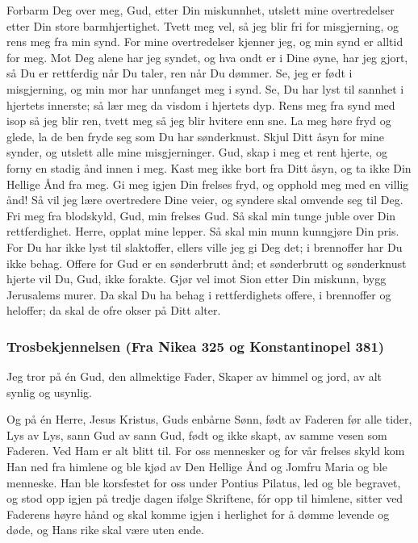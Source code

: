 Forbarm Deg over meg, Gud, etter Din miskunnhet, utslett mine overtredelser etter Din store barmhjertighet. Tvett meg vel, så jeg blir fri for misgjerning, og rens meg fra min synd. For mine overtredelser kjenner jeg, og min synd er alltid for meg. Mot Deg alene har jeg syndet, og hva ondt er i Dine øyne, har jeg gjort, så Du er rettferdig når Du taler, ren når Du dømmer. Se, jeg er født i misgjerning, og min mor har unnfanget meg i synd. Se, Du har lyst til sannhet i hjertets innerste; så lær meg da visdom i hjertets dyp. Rens meg fra synd med isop så jeg blir ren, tvett meg så jeg blir hvitere enn sne. La meg høre fryd og glede, la de ben fryde seg som Du har sønderknust. Skjul Ditt åsyn for mine synder, og utslett alle mine misgjerninger. Gud, skap i meg et rent hjerte, og forny en stadig ånd innen i meg. Kast meg ikke bort fra Ditt åsyn, og ta ikke Din Hellige Ånd fra meg. Gi meg igjen Din frelses fryd, og opphold meg med en villig ånd! Så vil jeg lære overtredere Dine veier, og syndere skal omvende seg til Deg. Fri meg fra blodskyld, Gud, min frelses Gud. Så skal min tunge juble over Din rettferdighet. Herre, opplat mine lepper. Så skal min munn kunngjøre Din pris. For Du har ikke lyst til slaktoffer, ellers ville jeg gi Deg det; i brennoffer har Du ikke behag. Offere for Gud er en sønderbrutt ånd; et sønderbrutt og sønderknust hjerte vil Du, Gud, ikke forakte. Gjør vel imot Sion etter Din miskunn, bygg Jerusalems murer. Da skal Du ha behag i rettferdighets offere, i brennoffer og heloffer; da skal de ofre okser på Ditt alter. 

\subsubsection{Trosbekjennelsen (Fra Nikea 325 og Konstantinopel 381) }

Jeg tror på én Gud, den allmektige Fader, Skaper av himmel og jord, av alt synlig og usynlig. 

Og på én Herre, Jesus Kristus, Guds enbårne Sønn, født av Faderen før alle tider, Lys av Lys, sann Gud av sann Gud, født og ikke skapt, av samme vesen som Faderen. Ved Ham er alt blitt til. For oss mennesker og for vår frelses skyld kom Han ned fra himlene og ble kjød av Den Hellige Ånd og Jomfru Maria og ble menneske. Han ble korsfestet for oss under Pontius Pilatus, led og ble begravet, og stod opp igjen på tredje dagen ifølge Skriftene, fór opp til himlene, sitter ved Faderens høyre hånd og skal komme igjen i herlighet for å dømme levende og døde, og Hans rike skal være uten ende. 

